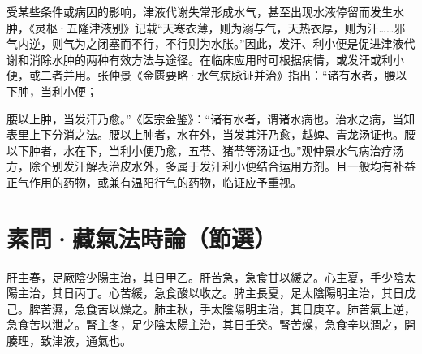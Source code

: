\documentclass[draft,12pt]{ctexbook}
\begin{document}
受某些条件或病因的影响，津液代谢失常形成水气，甚至出现水液停留而发生水肿，《灵枢·五隆津液别》记载“天寒衣薄，则为溺与气，天热衣厚，则为汗……邪气内逆，则气为之闭塞而不行，不行则为水胀。”因此，发汗、利小便是促进津液代谢和消除水肿的两种有效方法与途径。在临床应用时可根据病情，或发汗或利小便，或二者并用。张仲景《金匮要略·水气病脉证并治》指出：“诸有水者，腰以下肿，当利小便；

腰以上肿，当发汗乃愈。”《医宗金鉴》：“诸有水者，谓诸水病也。治水之病，当知表里上下分消之法。腰以上肿者，水在外，当发其汗乃愈，越婢、青龙汤证也。腰以下肿者，水在下，当利小便乃愈，五苓、猪苓等汤证也。”观仲景水气病治疗汤方，除个别发汗解表治皮水外，多属于发汗利小便结合运用方剂。且一般均有补益正气作用的药物，或兼有温阳行气的药物，临证应予重视。

\section{素問·藏氣法時論（節選）}%


\begin{yuanwen}
肝主春，足厥陰少陽主治，其日甲乙。肝苦急，急食甘以緩之。心主夏，手少陰太陽主治，其日丙丁。心苦緩，急食酸以收之。脾主長夏，足太陰陽明主治，其日戊己。脾苦濕，急食苦以燥之。肺主秋，手太陰陽明主治，其日庚辛。肺苦氣上逆，急食苦以泄之。腎主冬，足少陰太陽主治，其日壬癸。腎苦燥，急食辛以潤之，開腠理，致津液，通氣也。
\end{yuanwen}

\end{document}
